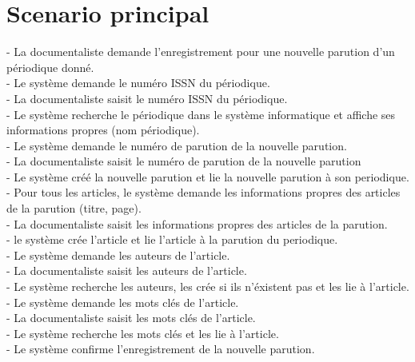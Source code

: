 \documentclass[a4paper,10pt]{report}
\begin{document}
\section*{Scenario principal}
\begin{flushleft}
- La documentaliste demande l'enregistrement pour une nouvelle parution d'un périodique donné.\\
- Le système demande le numéro ISSN du périodique.\\
- La documentaliste saisit le numéro ISSN du périodique.\\
- Le système recherche le périodique dans le système informatique et affiche ses informations propres (nom périodique).\\
- Le système demande le numéro de parution de la nouvelle parution.\\
- La documentaliste saisit le numéro de parution de la nouvelle parution\\
- Le système créé la nouvelle parution et lie la nouvelle parution à son periodique.\\
- Pour tous les articles, le système demande les informations propres des articles de la parution (titre, page).\\
- La documentaliste saisit les informations propres des articles de la parution.\\
- le système crée l'article et lie l'article à la parution du periodique.\\
- Le système demande les auteurs de l'article.\\
- La documentaliste saisit les auteurs de l'article.\\
- Le système recherche les auteurs, les crée si ils n'éxistent pas et les lie à l'article.\\
- Le système demande les mots clés de l'article.\\
- La documentaliste saisit les mots clés de l'article.\\
- Le système recherche les mots clés et les lie à l'article.\\
- Le système confirme l'enregistrement de la nouvelle parution.\\
\end{flushleft}

\bigskip
\end{document}

